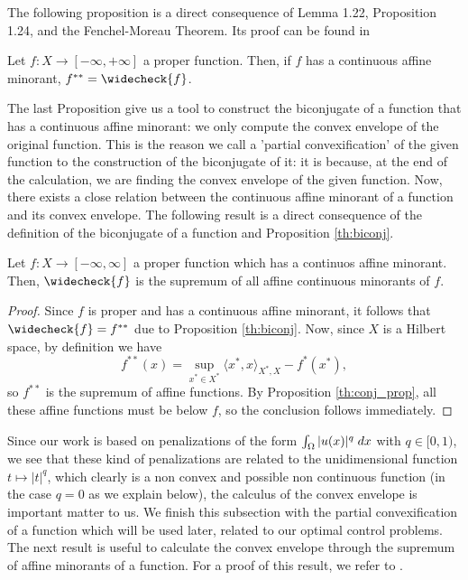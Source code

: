 The following proposition is a direct consequence of Lemma 1.22, Proposition 1.24, and the Fenchel-Moreau Theorem. Its proof can be found in \cite[Proposition 13.45]{combettes}

\begin{proposition}\label{th:biconj}
     Let $f:X\to [-\infty, +\infty]$ a proper function. Then, if $f$ has a continuous affine minorant, $f^{**}=\widecheck{f}$.
 \end{proposition}

The last Proposition give us a tool to construct the biconjugate of a function that has a continuous affine minorant: we only compute the convex envelope of the original function. This is the reason we call a 'partial convexification' of the given function to the construction of the biconjugate of it: it is because, at the end of the calculation, we are finding the convex envelope of the given function. Now, there exists a close relation between the continuous affine minorant of a function and its convex envelope. The following result is a direct consequence of the definition of the biconjugate of a function and Proposition \ref{th:biconj}.

\begin{proposition}\label{prop:convex_envelope_affine_minorants}
    Let $f:X\to [-\infty, \infty]$ a proper function which has a continuos affine minorant. Then, $\widecheck{f}$ is the supremum of all affine continuous minorants of $f$.
\end{proposition}

 \begin{proof}
     Since $f$ is proper and has a continuous affine minorant, it follows that $\widecheck{f}=f^{**}$ due to Proposition \ref{th:biconj}. Now, since $X$ is a Hilbert space, by definition we have
     \[
     f^{**}(x)=\sup_{x^*\in X^*} \langle x^{*}, x\rangle_{X^*,X}-f^{*}(x^*),
     \]
     so $f^{**}$ is the supremum of affine functions. By Proposition \ref{th:conj_prop}, all these affine functions must be below $f$, so the conclusion follows immediately.
 \end{proof}   

Since our work is based on penalizations of the form $\int_{\Omega}|u(x)|^q\; dx$ with $q\in [0,1)$, we see that these kind of penalizations are related to the unidimensional function $t\mapsto |t|^q$, which clearly is a non convex and possible non continuous function (in the case $q=0$ as we explain below), the calculus of the convex envelope is important matter to us. We finish this subsection with the partial convexification of a function which will be used later, related to our optimal control problems. The next result is useful to calculate the convex envelope through the supremum of affine minorants of a function. For a proof of this result, we refer to \cite[Theorem 9.19, Corollary 13.36]{combettes}.

